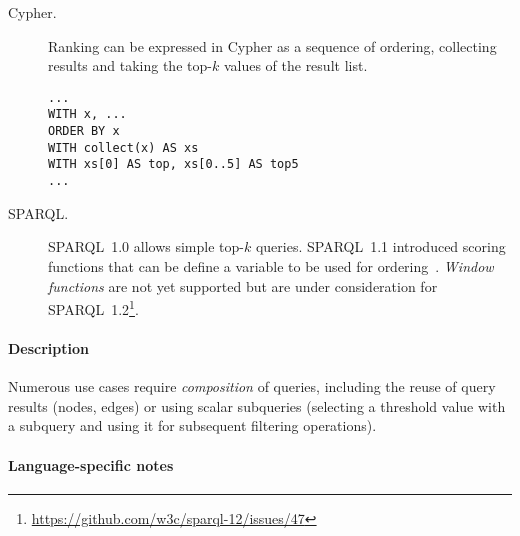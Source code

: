 \begin{description}
\item[Cypher.]
Ranking can be expressed in Cypher as a sequence of ordering, collecting results and taking the top-$k$ values of the result list.\\

\noindent\begin{minipage}{\linewidth}
\begin{lstlisting}[language=cypher]
...
WITH x, ...
ORDER BY x
WITH collect(x) AS xs
WITH xs[0] AS top, xs[0..5] AS top5
...
\end{lstlisting}
\end{minipage}

\item[SPARQL.] SPARQL~1.0 allows simple top-$k$ queries. SPARQL~1.1 introduced scoring functions that can be define a variable to be used for ordering~\cite{DBLP:conf/semweb/MagliacaneBV12}.
\emph{Window functions} are not yet supported but are under consideration for SPARQL~1.2\footnote{\url{https://github.com/w3c/sparql-12/issues/47}}.

\end{description}





\paragraph{Description}

Numerous use cases require \emph{composition} of queries, including the reuse of
query results (\eg nodes, edges) or using scalar subqueries (\eg selecting a
threshold value with a subquery and using it for subsequent filtering
operations).

\paragraph{Language-specific notes}

